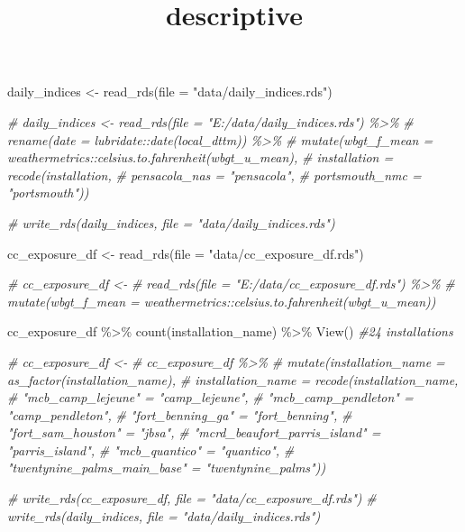 \documentclass[
]{article}
\title{descriptive}
\author{}
\date{\vspace{-2.5em}}
\newenvironment{Shaded}{\begin{snugshade}}{\end{snugshade}}
\newcommand{\AttributeTok}[1]{\textcolor[rgb]{0.77,0.63,0.00}{#1}}
\newcommand{\CommentTok}[1]{\textcolor[rgb]{0.56,0.35,0.01}{\textit{#1}}}
\newcommand{\FunctionTok}[1]{\textcolor[rgb]{0.00,0.00,0.00}{#1}}
\newcommand{\NormalTok}[1]{#1}
\newcommand{\OtherTok}[1]{\textcolor[rgb]{0.56,0.35,0.01}{#1}}
\newcommand{\SpecialCharTok}[1]{\textcolor[rgb]{0.00,0.00,0.00}{#1}}
\newcommand{\StringTok}[1]{\textcolor[rgb]{0.31,0.60,0.02}{#1}}
\begin{document}
\maketitle

\begin{Shaded}
\begin{Highlighting}[]
\NormalTok{daily\_indices }\OtherTok{\textless{}{-}} \FunctionTok{read\_rds}\NormalTok{(}\AttributeTok{file =} \StringTok{"data/daily\_indices.rds"}\NormalTok{)}


\CommentTok{\# daily\_indices \textless{}{-} read\_rds(file = "E:/data/daily\_indices.rds") \%\textgreater{}\% }
\CommentTok{\#   rename(date = \textasciigrave{}lubridate::date(local\_dttm)\textasciigrave{}) \%\textgreater{}\% }
\CommentTok{\#   mutate(wbgt\_f\_mean = weathermetrics::celsius.to.fahrenheit(wbgt\_u\_mean),}
\CommentTok{\#          installation = recode(installation, }
\CommentTok{\#                 \textasciigrave{}pensacola\_nas\textasciigrave{} = "pensacola",}
\CommentTok{\#                 \textasciigrave{}portsmouth\_nmc\textasciigrave{} = "portsmouth"))}

\CommentTok{\# write\_rds(daily\_indices, file = "data/daily\_indices.rds")}


\NormalTok{cc\_exposure\_df }\OtherTok{\textless{}{-}}
  \FunctionTok{read\_rds}\NormalTok{(}\AttributeTok{file =} \StringTok{"data/cc\_exposure\_df.rds"}\NormalTok{)}

\CommentTok{\# cc\_exposure\_df \textless{}{-}}
\CommentTok{\#   read\_rds(file = "E:/data/cc\_exposure\_df.rds") \%\textgreater{}\% }
\CommentTok{\#   mutate(wbgt\_f\_mean = weathermetrics::celsius.to.fahrenheit(wbgt\_u\_mean))}


\NormalTok{cc\_exposure\_df }\SpecialCharTok{\%\textgreater{}\%} 
  \FunctionTok{count}\NormalTok{(installation\_name) }\SpecialCharTok{\%\textgreater{}\%} \FunctionTok{View}\NormalTok{() }\CommentTok{\#24 installations}


\CommentTok{\# cc\_exposure\_df \textless{}{-}}
\CommentTok{\#   cc\_exposure\_df \%\textgreater{}\% }
\CommentTok{\#      mutate(installation\_name = as\_factor(installation\_name),}
\CommentTok{\#        installation\_name = recode(installation\_name,}
\CommentTok{\#         "mcb\_camp\_lejeune" = "camp\_lejeune",}
\CommentTok{\#         "mcb\_camp\_pendleton" = "camp\_pendleton",}
\CommentTok{\#         "fort\_benning\_ga" = "fort\_benning",}
\CommentTok{\#         "fort\_sam\_houston" = "jbsa",}
\CommentTok{\#         "mcrd\_beaufort\_parris\_island" = "parris\_island",}
\CommentTok{\#         "mcb\_quantico" = "quantico",}
\CommentTok{\#         "twentynine\_palms\_main\_base" = "twentynine\_palms")) }


\CommentTok{\# write\_rds(cc\_exposure\_df, file = "data/cc\_exposure\_df.rds")}
\CommentTok{\# write\_rds(daily\_indices, file = "data/daily\_indices.rds")}
\end{Highlighting}
\end{Shaded}
\end{document}
